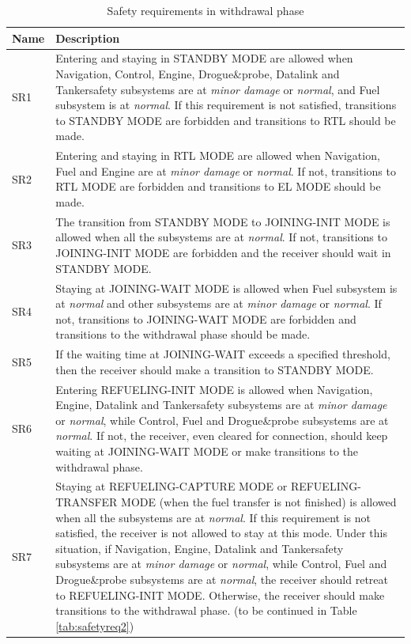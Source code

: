 \begin{table}
	\caption{Safety requirements in withdrawal phase \label{tab:safetyreq}}
	{\begin{tabular}{@{}lp{15cm}@{}}
			\hline \hline
			Name & Description \\
			\hline \hline 
			SR1	& Entering and staying in STANDBY MODE are allowed when Navigation, Control, Engine, Drogue\&probe, Datalink and Tankersafety subsystems are at \textit{minor damage} or \textit{normal}, and Fuel subsystem is at \textit{normal}. If this requirement is not satisfied, transitions to STANDBY MODE are forbidden and  transitions to RTL should be made. \\ 
			SR2 & Entering and staying in RTL MODE are allowed when Navigation, Fuel and Engine are at \textit{minor damage} or \textit{normal}. If not, transitions to RTL MODE are forbidden and transitions to EL MODE should be made. \\  
			SR3	& The transition from STANDBY MODE to \allowbreak JOINING-INIT MODE is allowed when all the subsystems are at \textit{normal}. If not, transitions to JOINING-INIT MODE are forbidden and the receiver should wait in STANDBY MODE. \\ 
			SR4 & Staying at JOINING-WAIT MODE is allowed when Fuel subsystem is at \textit{normal} and other subsystems are at \textit{minor damage} or \textit{normal}. If not, transitions to JOINING-WAIT MODE are forbidden and transitions to the withdrawal phase should be made. \\ 
			SR5 & If the waiting time at JOINING-WAIT exceeds a specified threshold, then the receiver should make a transition to STANDBY MODE. \\ 
			SR6	& Entering REFUELING-INIT MODE is allowed when Navigation, Engine, Datalink and Tankersafety subsystems are at \textit{minor damage} or \textit{normal}, while Control, Fuel and Drogue\&probe subsystems are at \textit{normal}. If not, the receiver, even cleared for connection, should keep waiting at JOINING-WAIT MODE or make transitions to the withdrawal phase. \\ 
			SR7 & Staying at REFUELING-CAPTURE MODE or REFUELING-TRANSFER MODE (when the fuel transfer is not finished) is allowed when all the subsystems are at \textit{normal}. If this requirement is not satisfied, the receiver is not allowed to stay at this mode. Under this situation, if Navigation, Engine, Datalink and Tankersafety subsystems are at \textit{minor damage} or \textit{normal}, while Control, Fuel and Drogue\&probe subsystems are at \textit{normal}, the receiver should retreat to REFUELING-INIT MODE. Otherwise, the receiver should make transitions to the withdrawal phase. (to be continued in Table \ref{tab:safetyreq2}) \\ 

\end{tabular}}
\end{table}
